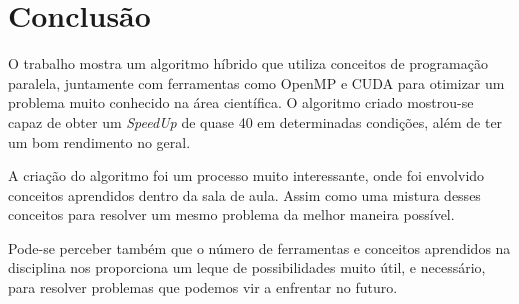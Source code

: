 \documentclass[12pt,openright,oneside,chapter=TITLE,section=TITLE,
    brazil]{utfpr-pg}
\begin{document}
\vspace{1cm}
{\let\clearpage\relax \chapter{Conclusão}}
\vspace{-0.7cm}

O trabalho mostra um algoritmo híbrido que utiliza conceitos de programação paralela, juntamente com ferramentas como OpenMP e CUDA para otimizar um problema muito conhecido na área científica. O algoritmo criado mostrou-se capaz de obter um \emph{SpeedUp} de quase 40 em determinadas condições, além de ter um bom rendimento no geral. 

A criação do algoritmo foi um processo muito interessante, onde foi envolvido conceitos aprendidos dentro da sala de aula. Assim como uma mistura desses conceitos para resolver um mesmo problema da melhor maneira possível. 

Pode-se perceber também que o número de ferramentas e conceitos aprendidos na disciplina nos proporciona um leque de possibilidades muito útil, e necessário, para resolver problemas que podemos vir a enfrentar no futuro.




\postextual

\end{document}
